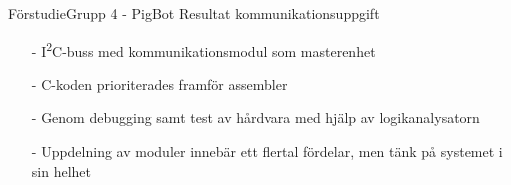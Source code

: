 
\begin{frame}{Förstudie}{Grupp 4 - PigBot}
Resultat kommunikationsuppgift
\pause
\begin{itemize}
	\item[-] I\textsuperscript{2}C-buss med kommunikationsmodul som masterenhet
	\item[-] C-koden prioriterades framför assembler
	\item[-] Genom debugging samt test av hårdvara med hjälp av logikanalysatorn
	\item[-] Uppdelning av moduler innebär ett flertal fördelar, men tänk på systemet i sin helhet
\end{itemize}
\end{frame}


